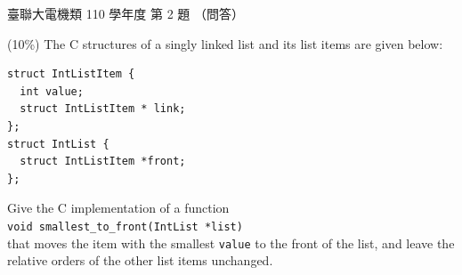 \begin{pastexam}[label={px:ust-110-ee-ds-02}]{臺聯大電機類 110 學年度 第 2 題}
（問答）

(10\%) The C structures of a singly linked list and its list items are given below:
\begin{verbatim}
struct IntListItem {
  int value;
  struct IntListItem * link;
};
struct IntList {
  struct IntListItem *front;
};
\end{verbatim}
Give the C implementation of a function\\
\texttt{void smallest\_to\_front(IntList *list)}\\
that moves the item with the smallest \texttt{value} to the front of the list, and leave the relative
orders of the other list items unchanged.
\end{pastexam}

